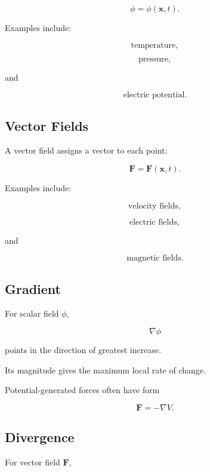 \[
\boxed{
\phi
=
\phi(\mathbf{x},t).
}
\]

Examples include:

\[
\boxed{
\text{temperature},
}
\]

\[
\boxed{
\text{pressure},
}
\]

and

\[
\boxed{
\text{electric potential}.
}
\]

\subsection{Vector Fields}
\label{subsec:physical-vector-fields}

A vector field assigns a vector to each point:

\[
\boxed{
\mathbf{F}
=
\mathbf{F}(\mathbf{x},t).
}
\]

Examples include:

\[
\boxed{
\text{velocity fields},
}
\]

\[
\boxed{
\text{electric fields},
}
\]

and

\[
\boxed{
\text{magnetic fields}.
}
\]

\subsection{Gradient}
\label{subsec:physical-gradient}

For scalar field \(\phi\),

\[
\boxed{
\nabla\phi
}
\]

points in the direction of greatest increase.

Its magnitude gives the maximum local rate of change.

Potential-generated forces often have form

\[
\boxed{
\mathbf{F}
=
-\nabla V.
}
\]

\subsection{Divergence}
\label{subsec:physical-divergence}

For vector field \(\mathbf{F}\),


